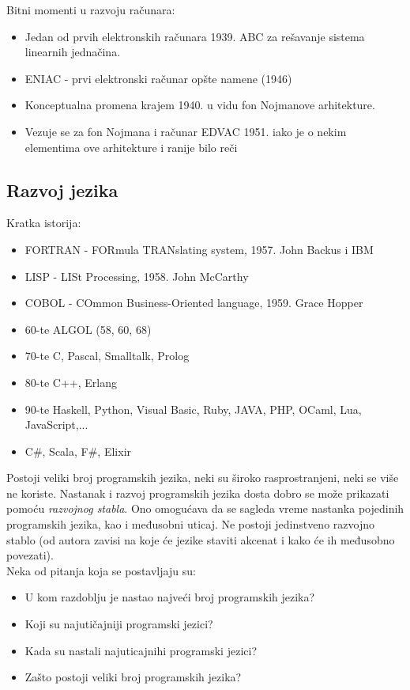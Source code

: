 \documentclass[../main.tex]{subfiles}
\begin{document}
Bitni momenti u razvoju računara:
\begin{itemize}
	\item Jedan od prvih elektronskih računara 1939. ABC za rešavanje sistema linearnih jednačina.
	\item ENIAC - prvi elektronski računar opšte namene (1946)
	\item Konceptualna promena krajem 1940. u vidu fon Nojmanove arhitekture.
	\item Vezuje se za fon Nojmana i računar EDVAC 1951. iako je o nekim elementima ove arhitekture i ranije bilo reči
\end{itemize}

\subsection{Razvoj jezika}

Kratka istorija:
\begin{itemize}
	\item FORTRAN - FORmula TRANslating system, 1957. John Backus i IBM
	\item LISP - LISt Processing, 1958. John McCarthy
	\item COBOL - COmmon Business-Oriented language, 1959. Grace Hopper
	\item 60-te ALGOL (58, 60, 68)
	\item 70-te C, Pascal, Smalltalk, Prolog
	\item 80-te C++, Erlang
	\item 90-te Haskell, Python, Visual Basic, Ruby, JAVA, PHP, OCaml, Lua, JavaScript,...
	\item C\#, Scala, F\#, Elixir
\end{itemize}
Postoji veliki broj programskih jezika, neki su široko rasprostranjeni, neki se više ne koriste. Nastanak i razvoj programskih jezika dosta dobro se može prikazati pomoću {\it razvojnog stabla}. Ono omogućava da se sagleda vreme nastanka pojedinih programskih jezika, kao i međusobni uticaj. Ne postoji jedinstveno razvojno stablo (od autora zavisi na koje će jezike staviti akcenat i kako će ih međusobno povezati).\\
Neka od pitanja koja se postavljaju su:
\begin{itemize}
	\item U kom razdoblju je nastao najveći broj programskih jezika?
	\item Koji su najutičajniji programski jezici?
	\item Kada su nastali najuticajnihi programski jezici?
	\item Zašto postoji veliki broj programskih jezika?
\end{itemize}
\end{document}
